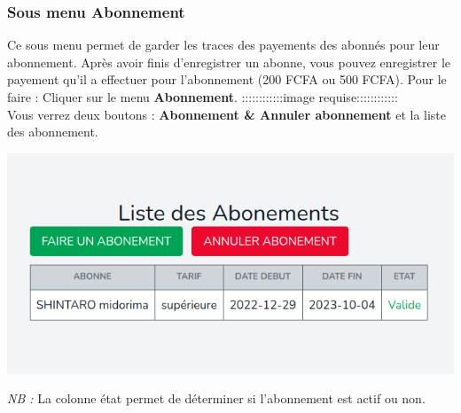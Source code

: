 \documentclass[12pt,a4paper]{article}
\begin{document}
\subsubsection{Sous menu \textbf{Abonnement}}
Ce sous menu permet de garder les traces des payements des abonnés pour leur
abonnement. Après avoir finis d'enregistrer un abonne, vous pouvez enregistrer le 
payement qu'il a effectuer pour l'abonnement (200 FCFA ou 500 FCFA). Pour le faire :
Cliquer sur le menu \textbf{Abonnement}. 
::::::::::::image requise::::::::::::\\
Vous verrez deux boutons : \textbf{Abonnement \& Annuler abonnement} et la liste des abonnement.\\
\begin{center}
\includegraphics[scale=0.56]{img/abonnements.png}
\end{center}
\textit{NB :} La colonne état permet de déterminer si l'abonnement est actif ou non.
\end{document}
